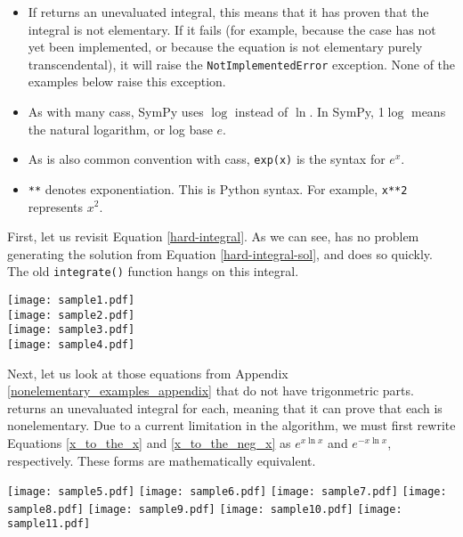 \begin{itemize}
\item If \rischintegrate{} returns an unevaluated integral, this means
that it has proven that the integral is not \gls{elementary}.  If it
fails (for example, because the case has not yet been implemented, or
because the equation is not \gls{elementary} purely
\gls{transcendental}), it will raise the \texttt{NotImplementedError}
exception.  None of the examples below raise this exception.

\item As with many \glspl{cas}, SymPy uses $\log$ instead of $\ln$. 
In SymPy, 1$\log$ means the natural logarithm, or log base $e$.

\item As is also common convention with \glspl{cas}, \texttt{exp(x)} is
the syntax for $e^x$.

\item \texttt{**} denotes exponentiation.  This is Python syntax.  For
example, \texttt{x**2} represents $x^2$.
\end{itemize}

First, let us revisit Equation \ref{hard-integral}.  As we can see,
\rischintegrate{} has no problem generating the solution from Equation
\ref{hard-integral-sol}, and does so quickly.  The old
\texttt{integrate()} function hangs on this integral.

\begin{flushleft}
\texttt{[image: sample1.pdf]}\\
\texttt{[image: sample2.pdf]}\\
\texttt{[image: sample3.pdf]}\\
\texttt{[image: sample4.pdf]}
\end{flushleft}

Next, let us look at those equations from Appendix
\ref{nonelementary_examples_appendix} that do not have
trigonmetric parts.  \rischintegrate{} returns an unevaluated integral for
each, meaning that it can prove that each is nonelementary.  Due to a
current limitation in the algorithm, we must first rewrite Equations
\ref{x_to_the_x} and \ref{x_to_the_neg_x} as $e^{x\ln{x}}$ and
$e^{-x\ln{x}}$, respectively.  These forms are mathematically equivalent.

\begin{flushleft}
\texttt{[image: sample5.pdf]}
\texttt{[image: sample6.pdf]}
\texttt{[image: sample7.pdf]}
\texttt{[image: sample8.pdf]}
\texttt{[image: sample9.pdf]}
\texttt{[image: sample10.pdf]}
\texttt{[image: sample11.pdf]}
\end{flushleft}

